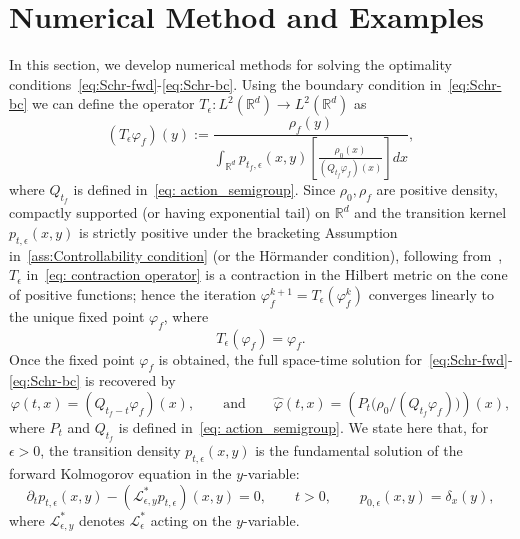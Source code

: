 \documentclass{amsart}
\numberwithin{equation}{section}
\newcommand{\R}{\mathbb{R}}
\newcommand{\map}[3]{#1:#2 \rightarrow #3}
\begin{document}
\section{Numerical Method and Examples}\label{sec: Numerical Method}
In this section, we develop numerical methods for solving the optimality conditions~\eqref{eq:Schr-fwd}-\eqref{eq:Schr-bc}. %
Using the boundary condition in~\eqref{eq:Schr-bc} we can define the operator $\map{T_{\epsilon}}{L^2(\R^d)}{L^2(\R^d)}$ as
\begin{equation}\label{eq: contraction operator}
(T_{\epsilon}\varphi_f)(y)
:=
\frac{\rho_f(y)}{\displaystyle\int_{\mathbb R^d} p_{t_f,\epsilon}(x,y)
\left[ \frac{\rho_0(x)}{(Q_{t_f}\varphi_f)(x)} \right] dx },
\end{equation}
where $Q_{t_f}$ is defined in~\eqref{eq: action_semigroup}. Since $\rho_0,\rho_f$ are positive density, compactly supported (or having exponential tail) on $\R^d$ and the transition kernel $p_{t,\epsilon}(x,y)$ is 
strictly positive under the bracketing  Assumption in~\ref{ass:Controllability condition} (or the H\"ormander condition), following from~\cite{Chen2016Hilbert}, $T_{\epsilon}$ in~\eqref{eq: contraction operator} is a contraction in the Hilbert metric on the cone of positive functions; hence the iteration 
$\varphi_f^{k+1} = T_{\epsilon}(\varphi_f^{k})$ converges linearly to the unique
fixed point $\varphi_f$, where 
\[
T_{\epsilon}(\varphi_f)= \varphi_f.
\]
Once the fixed point $\varphi_f$ is obtained, the full space-time solution for~\eqref{eq:Schr-fwd}-\eqref{eq:Schr-bc} is recovered by
\[
\varphi(t,x) = (Q_{t_f-t} \varphi_f)(x), \qquad\text{and}\qquad
\widehat{\varphi}(t,x) = (P_t\big( \rho_0 / (Q_{t_f}\varphi_f) \big))(x),
\]
where $P_t$ and $Q_{t_f}$ is defined in~\eqref{eq: action_semigroup}. We state here that, for \(\epsilon>0\), the transition density \(p_{t,\epsilon}(x,y)\)
is the fundamental solution of the forward Kolmogorov equation in the $y$-variable:
\[
\partial_t p_{t,\epsilon}(x,y) - (\mathcal L_{\epsilon,y}^* p_{t,\epsilon})(x,y)=0,\qquad t>0,
\qquad
p_{0,\epsilon}(x,y)=\delta_x(y),
\]
where \(\mathcal L_{\epsilon,y}^*\) denotes \(\mathcal L_\epsilon^*\) acting on the \(y\)-variable.
\end{document}
